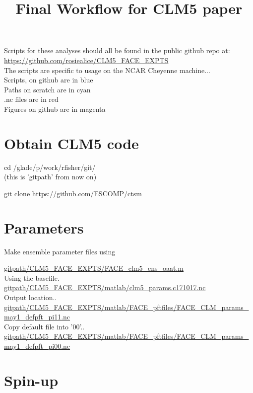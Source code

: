 \documentclass{article}
\begin{document}
\title{Final Workflow for CLM5 paper}


Scripts for these analyses should all be found in the public github repo at:\\
{\color{blue}\small{\url{https://github.com/rosiealice/CLM5_FACE_EXPTS}}}\\

The scripts are specific to usage on the NCAR Cheyenne machine...\\

{\color{blue} Scripts, on github are in blue}\\
{\color{cyan} Paths on scratch are in cyan}\\
{\color{red}  .nc files are in red}\\
{\color{magenta} Figures on github are in magenta}\\

\section{Obtain CLM5 code}
cd /glade/p/work/rfisher/git/\\
(this is 'gitpath' from now on)

git clone https://github.com/ESCOMP/ctsm 
\section{Parameters}

Make ensemble parameter files using

{\color{blue}\small{\url{gitpath/CLM5_FACE_EXPTS/FACE_clm5_ens_oaat.m}}}\\ 

Using the basefile. \\
{\color{red}\small{\url{gitpath/CLM5_FACE_EXPTS/matlab/clm5_params.c171017.nc}}} \\

Output location..\\
{\color{red}\small{\url{gitpath/CLM5_FACE_EXPTS/matlab/FACE_pftfiles/FACE_CLM_params_may1_defpft_pi11.nc }}} \\

Copy default file into '00'..\\
{\color{red}\small{\url{gitpath/CLM5_FACE_EXPTS/matlab/FACE_pftfiles/FACE_CLM_params_may1_defpft_pi00.nc }}} \\

\section{Spin-up}
\end{document}

